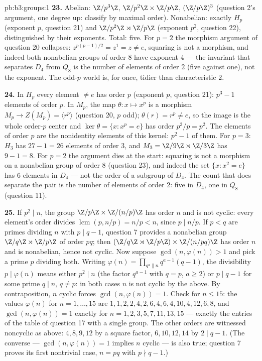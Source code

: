 \begin{solution}{pb:b3:groups:1}
\textbf{23.} Abelian: $\Z/p^3\Z$, $\Z/p^2\Z\times\Z/p\Z$,
$(\Z/p\Z)^3$ (question 2's argument, one degree up: classify by
maximal order). Nonabelian: exactly $H_p$ (exponent $p$,
question 21) and $\Z/p^2\Z\rtimes\Z/p\Z$ (exponent $p^2$,
question 22), distinguished by their exponents. Total: five.
For $p = 2$ the morphism argument of question 20 collapses:
$z^{p(p-1)/2} = z^{1} = z \neq e$, squaring is not a morphism,
and indeed both nonabelian groups of order $8$ have exponent
$4$ --- the invariant that separates $D_4$ from $Q_8$ is the
number of elements of order $2$ (five against one), not the
exponent. The odd-$p$ world is, for once, tidier than
characteristic $2$.

\textbf{24.} In $H_p$ every element $\neq e$ has order $p$
(exponent $p$, question 21): $p^3 - 1$ elements of order $p$.
In $M_p$, the map $\theta \colon x \mapsto x^p$ is a morphism
$M_p \to Z(M_p) = \langle r^p\rangle$ (question 20, $p$ odd);
$\theta(r) = r^p \neq e$, so the image is the whole order-$p$
center and $\ker\theta = \{x : x^p = e\}$ has order $p^3/p =
p^2$. The elements of order $p$ are the nonidentity elements
of this kernel: $p^2 - 1$ of them. For $p = 3$: $H_3$ has
$27 - 1 = 26$ elements of order $3$, and $M_3 = \Z/9\Z \rtimes
\Z/3\Z$ has $9 - 1 = 8$. For $p = 2$ the argument dies at the
start: squaring is not a morphism on a nonabelian group of
order $8$ (question 23), and indeed the set $\{x : x^2 = e\}$
has $6$ elements in $D_4$ --- not the order of a subgroup of
$D_4$. The count that does separate the pair is the number of
elements of order $2$: five in $D_4$, one in $Q_8$ (question
11).

\textbf{25.} If $p^2 \mid n$, the group $\Z/p\Z \times
\Z/(n/p)\Z$ has order $n$ and is not cyclic: every element's
order divides $\operatorname{lcm}(p, n/p) = n/p < n$, since
$p \mid n/p$. If $p < q$ are primes dividing $n$ with $p \mid
q - 1$, question 7 provides a nonabelian group $\Z/q\Z \rtimes
\Z/p\Z$ of order $pq$; then $(\Z/q\Z \rtimes \Z/p\Z) \times
\Z/(n/pq)\Z$ has order $n$ and is nonabelian, hence not
cyclic. Now suppose $\gcd(n, \varphi(n)) > 1$ and pick a prime
$p$ dividing both. Writing $\varphi(n) = \prod_{q^a \parallel
n} q^{a-1}(q - 1)$, the divisibility $p \mid \varphi(n)$
means either $p^2 \mid n$ (the factor $q^{a-1}$ with $q = p$,
$a \geq 2$) or $p \mid q - 1$ for some prime $q \mid n$, $q
\neq p$: in both cases $n$ is not cyclic by the above. By
contraposition, $n$ cyclic forces $\gcd(n, \varphi(n)) = 1$.
Check for $n \leq 15$: the values $\varphi(n)$ for $n = 1,
\dots, 15$ are $1, 1, 2, 2, 4, 2, 6, 4, 6, 4, 10, 4, 12, 6,
8$, and $\gcd(n, \varphi(n)) = 1$ exactly for $n = 1, 2, 3, 5,
7, 11, 13, 15$ --- exactly the entries of the table of
question 17 with a single group. The other orders are
witnessed noncyclic as above: $4, 8, 9, 12$ by a square
factor, $6, 10, 12, 14$ by $2 \mid q - 1$. (The converse ---
$\gcd(n, \varphi(n)) = 1$ implies $n$ cyclic --- is also true;
question 7 proves its first nontrivial case, $n = pq$ with
$p \nmid q - 1$.)
\end{solution}
